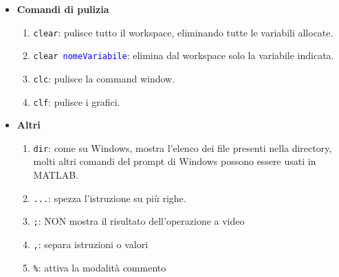 \begin{itemize}
    \item    \textbf{Comandi di pulizia}\\
            \begin{enumerate}
                \item \texttt{clear}: pulisce tutto il workspace, eliminando tutte le variabili allocate.
                \item \texttt{clear \textcolor{blue}{nomeVariabile}}: elimina dal workspace solo la variabile indicata.
                \item \texttt{clc}: pulisce la command window.
                \item \texttt{clf}: pulisce i grafici.
            \end{enumerate}
\newpage
    \item   \textbf{Altri }  \\
            \begin{enumerate}
                \item \texttt{dir}: come su Windows, mostra l'elenco dei file presenti nella directory, molti altri 
                comandi del prompt di Windows possono essere usati in MATLAB.
                \item \texttt{...}: spezza l'istruzione su più righe.
                \item \texttt{;}: NON mostra il risultato dell'operazione a video
                \item \texttt{,}: separa istruzioni o valori
                \item \texttt{\%}: attiva la modalità commento
            \end{enumerate}
\end{itemize}